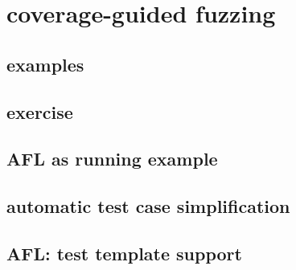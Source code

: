 \section{coverage-guided fuzzing}


\subsection{examples}


\subsection{exercise}


\subsection{AFL as running example}


\subsection{automatic test case simplification}


\subsection{AFL: test template support}

